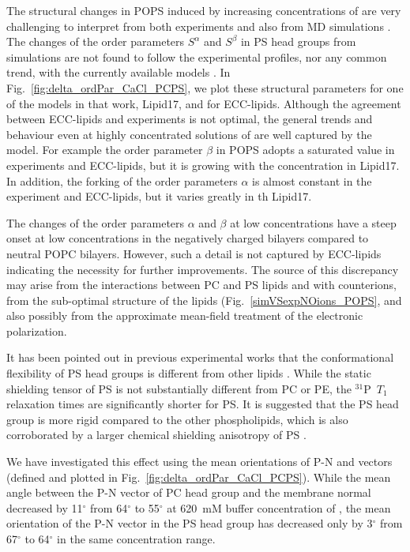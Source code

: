 \documentclass[journal=jpcbfk,manuscript=article]{achemso}
\begin{document}
The structural changes in POPS induced by increasing concentrations of  
are very challenging to interpret from both experiments \cite{roux90} 
and also from MD simulations \cite{nmrlipids_proj4}. 
The changes of the order parameters $S^\alpha$ and $S^\beta$ in PS head groups from simulations 
are not found to follow the experimental profiles, 
nor any common trend,
with the currently available models \cite{nmrlipids_proj4}. 
In Fig.~\ref{fig:delta_ordPar_CaCl_PCPS},
we plot these structural parameters for one of the models in that work, Lipid17, 
and for ECC-lipids. 
Although the agreement between ECC-lipids and experiments is not optimal,
the general trends and behaviour even at highly concentrated solutions of  
are well captured by the model. 
For example the order parameter $\beta$ in POPS 
adopts a saturated value in experiments and ECC-lipids,
but it is growing with the  concentration in Lipid17.
In addition, 
the forking of the order parameters $\alpha$ 
is almost constant in the experiment and ECC-lipids,
but it varies greatly in th Lipid17. 


The changes of the order parameters $\alpha$ and $\beta$ at low  concentrations
have a steep onset at low concentrations in the negatively charged bilayers compared to neutral POPC bilayers. 
However, such a detail is not captured by ECC-lipids
indicating the necessity for further improvements.
The source of this discrepancy may arise 
from the interactions between PC and PS lipids and with  counterions,
from the sub-optimal structure of the lipids (Fig.~\ref{simVSexpNOions_POPS},
and also possibly from the approximate mean-field treatment of the electronic polarization. 


It has been pointed out in previous experimental works
that the conformational flexibility of PS head groups 
is different from other lipids \cite{browning80}. 
While the static shielding tensor of PS is not substantially different from PC or PE, 
the $^{31}$P~$T_1$ relaxation times are significantly shorter for PS. 
It is suggested that the PS head group is more rigid compared to the other phospholipids, 
which is also corroborated by a larger chemical shielding anisotropy of PS \cite{browning80}. 

We have investigated this effect using the mean orientations of P-N and  vectors 
(defined and plotted in Fig.~\ref{fig:delta_ordPar_CaCl_PCPS}). 
While the mean angle between the P-N vector of PC head group and the membrane normal
decreased by 11$^\circ$ from 64$^\circ$ to 55$^\circ$
 at 620~mM buffer concentration of ,
the mean orientation of the P-N vector in the PS head group has 
decreased only by 3$^\circ$ from 67$^\circ$ to 64$^\circ$ 
in the same concentration range. 
\end{document}

